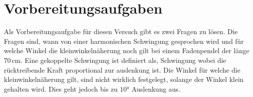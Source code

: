 \section{Vorbereitungsaufgaben}
\begin{flushleft}
    Als Vorbereitungsaufgabe für diesen Versuch gibt es zwei Fragen zu lösen.
    Die Fragen sind, wann von einer harmonischen Schwingung gesprochen wird und für welche Winkel die kleinwinkelnäherung noch gilt 
    bei einem Fadenpendel der länge $ 70 \, \unit{\centi\meter} $. 
    Eine gekoppelte Schwingung ist definiert als, Schwingung wobei die rücktreibende Kraft proportional zur auslenkung ist. 
    Die Winkel für welche die kleinwinkelnäherung gilt, sind nicht wirklich festgelegt, solange der Winkel klein gehalten wird. 
    Dies geht jedoch bis zu $ 10 \unit{\degree}$ Auslenkung aus. 
\end{flushleft}